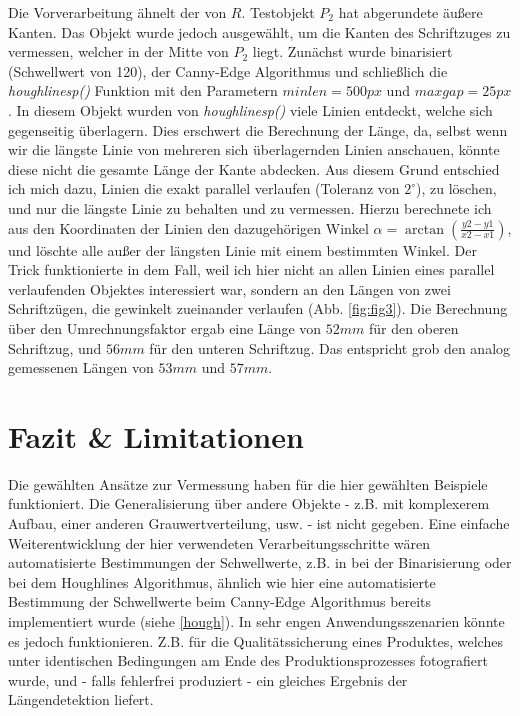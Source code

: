 \documentclass{article}
\begin{document}
Die Vorverarbeitung ähnelt der von $R$. Testobjekt $P_{2}$ hat abgerundete äußere Kanten. Das Objekt wurde jedoch ausgewählt, um die Kanten des Schriftzuges zu vermessen, welcher in der Mitte von $P_{2}$ liegt. Zunächst wurde binarisiert (Schwellwert von 120), der Canny-Edge Algorithmus und schließlich die \textit{houghlinesp()} Funktion mit den Parametern $minlen = 500px$ und $maxgap = 25px$. In diesem Objekt wurden von \textit{houghlinesp()} viele Linien entdeckt, welche sich gegenseitig überlagern. Dies erschwert die Berechnung der Länge, da, selbst wenn wir die längste Linie von mehreren sich überlagernden Linien anschauen, könnte diese nicht die gesamte Länge der Kante abdecken. Aus diesem Grund entschied ich mich dazu, Linien die exakt parallel verlaufen (Toleranz von $2^{\circ}$), zu löschen, und nur die längste Linie zu behalten und zu vermessen. Hierzu berechnete ich aus den Koordinaten der Linien den dazugehörigen Winkel $\alpha = \arctan(\frac{y2-y1}{x2-x1})$, und löschte alle außer der längsten Linie mit einem bestimmten Winkel. Der Trick funktionierte in dem Fall, weil ich hier nicht an allen Linien eines parallel verlaufenden Objektes interessiert war, sondern an den Längen von zwei Schriftzügen, die gewinkelt zueinander verlaufen (Abb. \ref{fig:fig3}). Die Berechnung über den Umrechnungsfaktor ergab eine Länge von $52mm$ für den oberen Schriftzug, und $56mm$ für den unteren Schriftzug. Das entspricht grob den analog gemessenen Längen von $53mm$ und $57mm$.

\section{Fazit \& Limitationen}

Die gewählten Ansätze zur Vermessung haben für die hier gewählten Beispiele funktioniert. Die Generalisierung über andere Objekte - z.B. mit komplexerem Aufbau, einer anderen Grauwertverteilung, usw. - ist nicht gegeben. Eine einfache Weiterentwicklung der hier verwendeten Verarbeitungsschritte wären automatisierte Bestimmungen der Schwellwerte, z.B. in bei der Binarisierung oder bei dem Houghlines Algorithmus, ähnlich wie hier eine automatisierte Bestimmung der Schwellwerte beim Canny-Edge Algorithmus bereits implementiert wurde (siehe \ref{hough}). In sehr engen Anwendungsszenarien könnte es jedoch funktionieren. Z.B. für die Qualitätssicherung eines Produktes, welches unter identischen Bedingungen am Ende des Produktionsprozesses fotografiert wurde, und - falls fehlerfrei produziert - ein gleiches Ergebnis der Längendetektion liefert.
\end{document}
